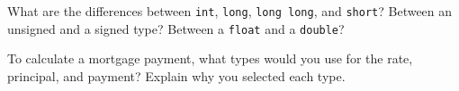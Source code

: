 %
%
\begin{question}
What are the differences between \verb|int|, \verb|long|, \verb|long long|,
and \verb|short|? Between an unsigned and a signed type? Between a \verb|float| and
a \verb|double|?
\end{question}

\begin{question}
To calculate a mortgage payment, what types would you use
for the rate, principal, and payment? Explain why you selected each type.
\end{question}

